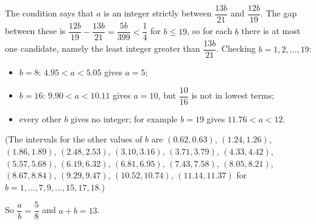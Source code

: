 The condition says that $a$ is an integer strictly between $\dfrac{13b}{21}$ and $\dfrac{12b}{19}$. The gap between these is $\dfrac{12b}{19}-\dfrac{13b}{21}=\dfrac{5b}{399}<\dfrac14$ for $b\le19$, so for each $b$ there is at most one candidate, namely the least integer greater than $\dfrac{13b}{21}$. Checking $b=1,2,\dots,19$:
\begin{itemize}
\item $b=8$: $4.95<a<5.05$ gives $a=5$;
\item $b=16$: $9.90<a<10.11$ gives $a=10$, but $\dfrac{10}{16}$ is not in lowest terms;
\item every other $b$ gives no integer; for example $b=19$ gives $11.76<a<12$.
\end{itemize}
(The intervals for the other values of $b$ are $(0.62,0.63)$, $(1.24,1.26)$, $(1.86,1.89)$, $(2.48,2.53)$, $(3.10,3.16)$, $(3.71,3.79)$, $(4.33,4.42)$, $(5.57,5.68)$, $(6.19,6.32)$, $(6.81,6.95)$, $(7.43,7.58)$, $(8.05,8.21)$, $(8.67,8.84)$, $(9.29,9.47)$, $(10.52,10.74)$, $(11.14,11.37)$ for $b=1,\dots,7,9,\dots,15,17,18$.)

So $\dfrac ab=\dfrac58$ and $a+b=\boxed{13}$.
